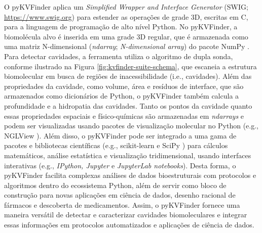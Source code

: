 \documentclass[Portugues]{phdquali}
\def\ie{i.e.\onedot}
\def\eg{e.g.\onedot}
\begin{document}
O pyKVFinder aplica um \textit{Simplified Wrapper and Interface Generator} (SWIG; \url{https://www.swig.org}) para estender as operações de grade 3D, escritas em C, para a linguagem de programação de alto nível Python. No pyKVFinder, a biomolécula alvo é inserida em uma grade 3D regular, que é armazenada como uma matriz N-dimensional (\textit{ndarray}; \textit{N-dimensional array}) do pacote NumPy \cite{numpy}. Para detectar cavidades, a ferramenta utiliza o algoritmo de dupla sonda, conforme ilustrado na Figura \ref{fig:kvfinder-suite-schema}, que escaneia a estrutura biomolecular em busca de regiões de inacessibilidade (\ie, cavidades). Além das propriedades da cavidade, como volume, área e resíduos de interface, que são armazenados como dicionários de Python, o pyKVFinder também calcula a profundidade e a hidropatia das cavidades. Tanto os pontos da cavidade quanto essas propriedades espaciais e físico-químicas são armazenadas em \textit{ndarrays} e podem ser visualizadas usando pacotes de visualização molecular no Python (\eg, NGLView \cite{nglview}). Além disso, o pyKVFinder pode ser integrado a uma gama de pacotes e bibliotecas científicas (\eg, scikit-learn \cite{scikit-learn} e SciPy \cite{scipy}) para cálculos matemáticos, análise estatística e visualização tridimensional, usando interfaces interativas (\eg, \textit{IPython, Jupyter} e \textit{JupyterLab notebooks}). Desta forma, o pyKVFinder facilita complexas análises de dados bioestruturais com protocolos e algoritmos dentro do ecossistema Python, além de servir como bloco de construção para novas aplicações em ciência de dados, desenho racional de fármacos e descoberta de medicamentos. Assim, o pyKVFinder fornece uma maneira versátil de detectar e caracterizar cavidades biomoleculares e integrar essas informações em protocolos automatizados e aplicações de ciência de dados.
\end{document}
